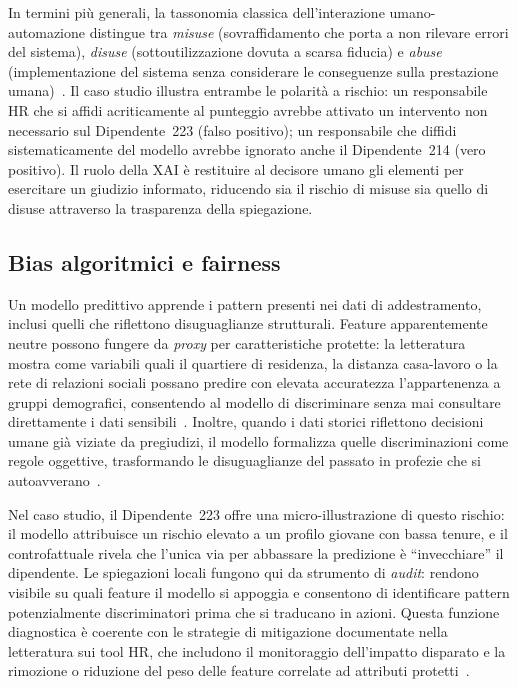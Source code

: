 In termini più generali, la tassonomia classica dell'interazione umano-automazione distingue tra \emph{misuse} (sovraffidamento che porta a non rilevare errori del sistema), \emph{disuse} (sottoutilizzazione dovuta a scarsa fiducia) e \emph{abuse} (implementazione del sistema senza considerare le conseguenze sulla prestazione umana)~\cite{parasuraman1997humans}. Il caso studio illustra entrambe le polarità a rischio: un responsabile HR che si affidi acriticamente al punteggio avrebbe attivato un intervento non necessario sul Dipendente~223 (falso positivo); un responsabile che diffidi sistematicamente del modello avrebbe ignorato anche il Dipendente~214 (vero positivo). Il ruolo della XAI è restituire al decisore umano gli elementi per esercitare un giudizio informato, riducendo sia il rischio di misuse sia quello di disuse attraverso la trasparenza della spiegazione.

\subsection{Bias algoritmici e fairness}

Un modello predittivo apprende i pattern presenti nei dati di addestramento, inclusi quelli che riflettono disuguaglianze strutturali. Feature apparentemente neutre possono fungere da \emph{proxy} per caratteristiche protette: la letteratura mostra come variabili quali il quartiere di residenza, la distanza casa-lavoro o la rete di relazioni sociali possano predire con elevata accuratezza l'appartenenza a gruppi demografici, consentendo al modello di discriminare senza mai consultare direttamente i dati sensibili~\cite{barocas2016big}. Inoltre, quando i dati storici riflettono decisioni umane già viziate da pregiudizi, il modello formalizza quelle discriminazioni come regole oggettive, trasformando le disuguaglianze del passato in profezie che si autoavverano~\cite{barocas2016big}.

Nel caso studio, il Dipendente~223 offre una micro-illustrazione di questo rischio: il modello attribuisce un rischio elevato a un profilo giovane con bassa tenure, e il controfattuale rivela che l'unica via per abbassare la predizione è ``invecchiare'' il dipendente. Le spiegazioni locali fungono qui da strumento di \emph{audit}: rendono visibile su quali feature il modello si appoggia e consentono di identificare pattern potenzialmente discriminatori prima che si traducano in azioni. Questa funzione diagnostica è coerente con le strategie di mitigazione documentate nella letteratura sui tool HR, che includono il monitoraggio dell'impatto disparato e la rimozione o riduzione del peso delle feature correlate ad attributi protetti~\cite{raghavan2020mitigating}.

